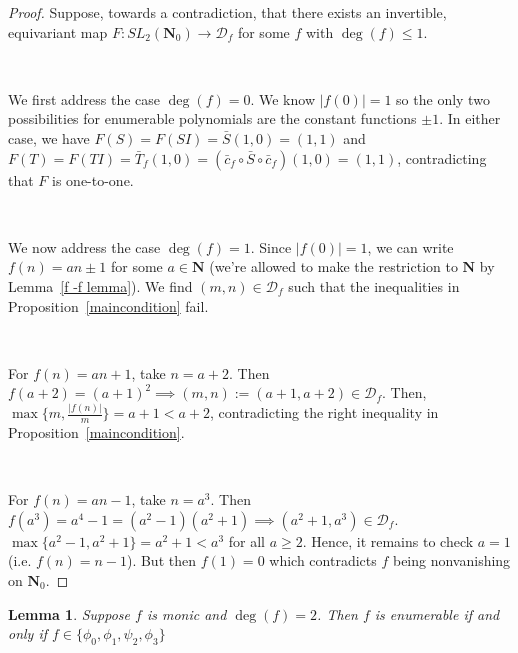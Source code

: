 \documentclass{article}
\newtheorem{lemma}[theorem]{Lemma}  %
\begin{document}
\begin{proof}
Suppose, towards a contradiction, that there exists an invertible, equivariant map $F: SL_2(\mathbf{N}_0) \rightarrow \mathcal{D}_f$ for some $f$ with $\deg(f) \leq 1$.

\

We first address the case $\deg(f) = 0$. We know $|f(0)| = 1$ so the only two possibilities for enumerable polynomials are the constant functions $\pm 1$. In either case, we have $F(S) = F(SI) =  \bar{S}(1,0) = (1,1)$ and $F(T) = F(TI) = \bar{T}_f(1,0) = (\bar{c}_f \circ \bar{S} \circ \bar{c}_f) (1,0) = (1,1)$, contradicting that $F$ is one-to-one.

\

We now address the case $\deg(f) = 1$. Since $|f(0)| = 1$, we can write $f(n) = an \pm 1$ for some $a \in \mathbf{N}$ (we're allowed to make the restriction to $\mathbf{N}$ by Lemma~\ref{f -f lemma}). We find $(m, n) \in \mathcal{D}_f$ such that the inequalities in Proposition~\ref{maincondition} fail.

\

For $f(n) = an+1$, take $n = a+2$. Then $f(a+2) = (a+1)^2 \implies (m, n) := (a+1, a+2) \in \mathcal{D}_f$. Then, $\max \{m, \frac{|f(n)|}{m} \} = a+1 < a+2$, contradicting the right inequality in Proposition~\ref{maincondition}.

\

For $f(n) = an-1$, take $n = a^3$. Then $f(a^3) = a^4 - 1 = (a^2 - 1)(a^2 + 1) \implies (a^2 + 1, a^3) \in \mathcal{D}_f$. $\max \{a^2-1, a^2+1 \} = a^2 + 1 < a^3$ for all $a \geq 2$. Hence, it remains to check $a = 1$ (i.e. $f(n) = n-1$). But then $f(1) = 0$ which contradicts $f$ being nonvanishing on $\mathbf{N}_0$.
\end{proof}

\begin{lemma}
Suppose $f$ is monic and $\deg(f) = 2$. Then $f$ is enumerable if and only if $f \in \{\phi_0, \phi_1, \psi_2, \phi_3\}$
\end{lemma}
\end{document}
